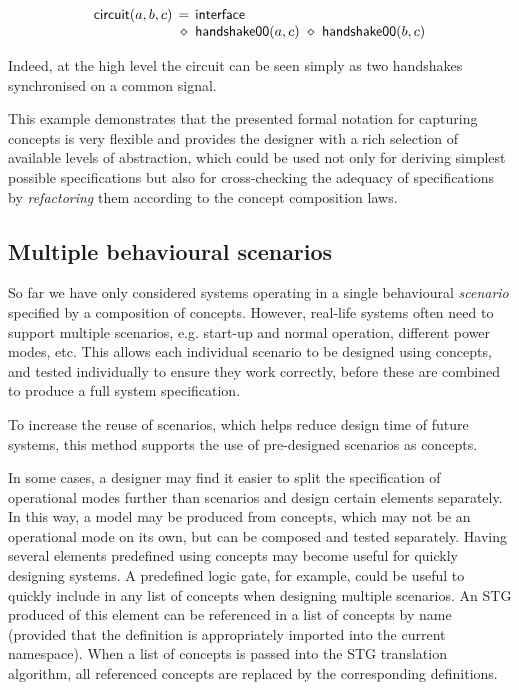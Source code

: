 \documentclass[british,compsoc]{IEEEtran}
\begin{document}
\vspace{-3mm}
\[
\begin{array}{lcl}
\mathsf{circuit}(a,b,c)&\hspace{-2mm}=&\hspace{-2mm}\mathsf{interface}\\
~&\hspace{-2mm}\diamond&\hspace{-2mm}\mathsf{handshake00}(a,c)~\diamond~\mathsf{handshake00}(b,c)\\
\end{array}
\]

\noindent Indeed, at the high level the circuit can be seen simply as two
handshakes synchronised on a common signal.

This example demonstrates that the presented formal notation for capturing
concepts is very flexible and provides the designer with a rich selection
of available levels of abstraction, which could be used not only for
deriving simplest possible specifications but also for cross-checking
the adequacy of specifications by \emph{refactoring} them according
to the concept composition laws.

\vspace{-1mm}
\subsection{Multiple behavioural scenarios\label{sub:scenarios}}

So far we have only considered systems operating in a single behavioural
\textit{scenario} specified by a composition of concepts. However,
real-life systems often need to support multiple scenarios, e.g. start-up
and normal operation, different power modes, etc. This allows
each individual scenario to be designed using concepts,
and tested individually to ensure they work correctly, before these
are combined to produce a full system specification.

To increase the reuse of scenarios, which helps reduce design
time of future systems, this method supports the use of pre-designed
scenarios as concepts.

In some cases, a designer may find it easier to split the specification
of operational modes further than scenarios and design certain elements
separately. In this way, a model may be produced from concepts, which
may not be an operational mode on its own, but can be composed and
tested separately. Having several elements predefined
using concepts may become useful for quickly designing systems. A
predefined logic gate, for example, could be useful to quickly include
in any list of concepts when designing multiple scenarios. An STG
produced of this element can be referenced in a list of concepts by
name (provided that the definition is appropriately imported into
the current namespace). When a list of concepts is passed into the
STG translation algorithm, all referenced concepts are replaced by
the corresponding definitions.
\end{document}
